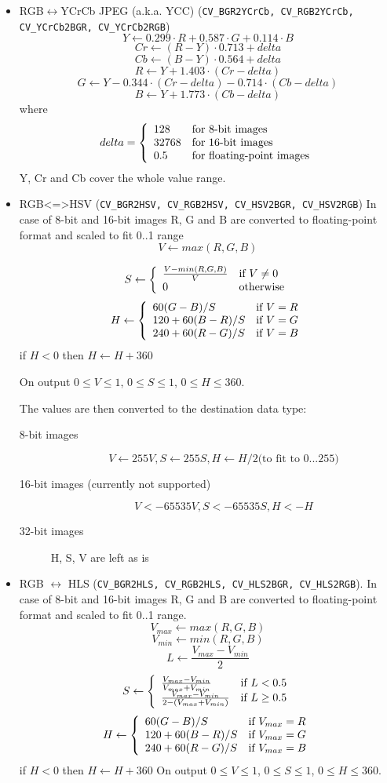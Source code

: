 \begin{itemize}
 \item RGB$\leftrightarrow$YCrCb JPEG (a.k.a. YCC) (\texttt{CV\_BGR2YCrCb, CV\_RGB2YCrCb, CV\_YCrCb2BGR, CV\_YCrCb2RGB})
 \[ Y \leftarrow 0.299 \cdot R + 0.587 \cdot G + 0.114 \cdot B \]
 \[  Cr \leftarrow (R-Y) \cdot 0.713 + delta \]
 \[  Cb \leftarrow (B-Y) \cdot 0.564 + delta \]
 \[  R \leftarrow Y + 1.403 \cdot (Cr - delta) \]
 \[  G \leftarrow Y - 0.344 \cdot (Cr - delta) - 0.714 \cdot (Cb - delta) \]
 \[  B \leftarrow Y + 1.773 \cdot (Cb - delta) \]
where
 \[
  delta = \left\{
  \begin{array}{l l}
  128 & \mbox{for 8-bit images}\\
  32768 & \mbox{for 16-bit images}\\
  0.5 & \mbox{for floating-point images}
  \end{array} \right.
 \]
Y, Cr and Cb cover the whole value range.

 \item RGB<=>HSV (\texttt{CV\_BGR2HSV, CV\_RGB2HSV, CV\_HSV2BGR, CV\_HSV2RGB})
  In case of 8-bit and 16-bit images
  R, G and B are converted to floating-point format and scaled to fit 0..1 range
  \[ V \leftarrow max(R,G,B) \]

\[ S \leftarrow \left\{ \begin{array}{l l} \frac{V-min(R,G,B)}{V} & \mbox{if $V \neq 0$}\\ 0 & \mbox{otherwise}\\ \end{array} \right. \]
\[ H \leftarrow \left\{ \begin{array}{l l} {60(G - B)}/{S} & \mbox{if $V=R$}\\ {120+60(B - R)}/{S} & \mbox{if $V=G$}\\ {240+60(R - G)}/{S} & \mbox{if $V=B$}\\ \end{array} \right. \]
if $H<0$ then $H \leftarrow H+360$

On output $0 \leq V \leq 1$, $0 \leq S \leq 1$, $0 \leq H \leq 360$.

The values are then converted to the destination data type:
\begin{description}
\item[8-bit images]
\[ V \leftarrow 255 V, S \leftarrow 255 S, H \leftarrow H/2 \text{(to fit to 0...255)} \]
\item[16-bit images (currently not supported)]
\[ V <- 65535 V, S <- 65535 S, H <- H \]
\item[32-bit images]
H, S, V are left as is
\end{description}

 \item RGB $\leftrightarrow$ HLS (\texttt{CV\_BGR2HLS, CV\_RGB2HLS, CV\_HLS2BGR, CV\_HLS2RGB}).
  In case of 8-bit and 16-bit images
  R, G and B are converted to floating-point format and scaled to fit 0..1 range.
  \[ V_{max} \leftarrow {max}(R,G,B) \]
  \[ V_{min} \leftarrow {min}(R,G,B) \]
  \[ L \leftarrow \frac{V_{max} - V_{min}}{2} \]
  \[ S \leftarrow \left\{ \begin{array}{l l} \frac{V_{max} - V_{min}}{V_{max} + V_{min}} & \mbox{if $L < 0.5$}\\ \frac{V_{max} - V_{min}}{2 - (V_{max} + V_{min})} & \mbox{if $L \ge 0.5$}\\ \end{array} \right. \]
  \[ H \leftarrow \left\{ \begin{array}{l l} {60(G - B)}/{S} & \mbox{if $V_{max}=R$}\\ {120+60(B - R)}/{S} & \mbox{if $V_{max}=G$}\\ {240+60(R - G)}/{S} & \mbox{if $V_{max}=B$}\\ \end{array} \right. \]
  if $H<0$ then $H \leftarrow H+360$
On output $0 \leq V \leq 1$, $0 \leq S \leq 1$, $0 \leq H \leq 360$.


\end{itemize}
